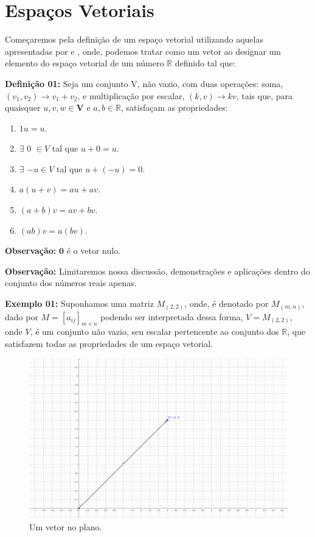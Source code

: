 \chapter{Espaços Vetoriais}
Começaremos pela definição de um espaço vetorial utilizando aquelas apresentadas por \cite{boldrini1980} e \cite{ulhoa2018}, onde, podemos tratar como um vetor ao designar um elemento do espaço vetorial de um número $\mathbb{R}$ definido tal que:

\noindent\textbf{Definição 01:} Seja um conjunto V, não vazio, com duas operações: soma, $(v_1, v_2) \rightarrow v_1 + v_2$, e multiplicação por escalar, $(k, v) \rightarrow kv$, tais que, para quaisquer $u, v, w \in \mathbf{V}$ e $a, b \in \mathbb{R}$, satisfaçam as propriedades: \nocite{boldrini1980}

\begin{enumerate}
	\item $1u = u$.
	\item $\exists$ $0$ $\in V$ tal que $u + 0 = u$.
	\item $\exists$ $-u \in V$ tal que $u + (-u) = 0$.
	\item $a(u + v) = au + av$.
	\item $(a + b)v = av + bv$.
	\item $(ab)v = a(bv)$.
\end{enumerate}

\noindent\textbf{Observação:} $\textbf{0}$ é o vetor nulo. \nocite{ulhoa2018}

\noindent\textbf{Observação:} Limitaremos nossa discussão, demonstrações e aplicações dentro do conjunto dos números reais apenas.

\noindent\textbf{Exemplo 01:} Suponhamos uma matriz $M_{(2, 2)}$, onde, é denotado por $M_{(m,n)}$, dado por $M = [a_{ij}]_{m \times n}$ podendo ser interpretada dessa forma, $V = M_{(2, 2)}$, onde $V$, é um conjunto não vazio, seu escalar pertencente ao conjunto dos $\mathbb{R}$, que satisfazem todas as propriedades de um espaço vetorial.

\begin{figure}[H]
	\centering
	\includegraphics[scale=2.00]{exemplo01.png}
	\caption{Um vetor no plano.}
\end{figure}

